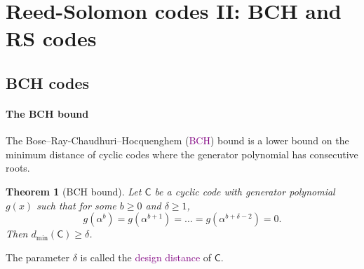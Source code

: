 \documentclass[a4paper, 11pt, openany]{book}
\numberwithin{equation}{section}
\theoremstyle{plain}
\newtheorem{theorem}	[equation]	{Theorem}
\theoremstyle{definition}
\newcommand{\Define}[1]{\textcolor{purple}{#1}}
\newcommand{\code}[1]{\mathsf{#1}}
\begin{document}
\section{Reed-Solomon codes II: BCH and RS codes}
\label{sec:27}



\subsection{BCH codes}

\paragraph{The BCH bound}
The Bose--Ray-Chaudhuri--Hocquenghem (\Define{BCH}) bound is a lower bound on the minimum distance of cyclic codes where the generator polynomial has consecutive roots.

\begin{theorem}[BCH bound] Let $\code{C}$ be a cyclic code with generator polynomial $g(x)$ such that for some $b \ge 0$ and $\delta \ge 1$,
$$
	g(\alpha^b) = g(\alpha^{b+1}) = \dots = g(\alpha^{b + \delta - 2}) = 0.
$$
Then $d_{\min}(\code{C}) \ge \delta$.
\end{theorem}

The parameter $\delta$ is called the \Define{design distance} of $\code{C}$.
\end{document}
